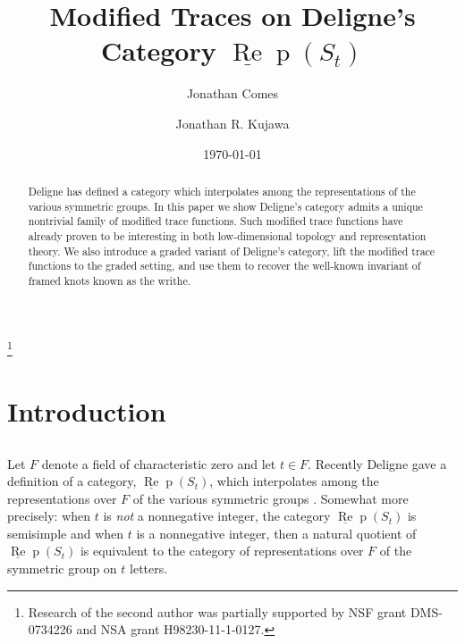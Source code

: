 \documentclass[12pt, reqno]{amsart}
\theoremstyle{definition}
\def\uRep{\underline{\operatorname{Re}}\!\operatorname{p}}
\renewcommand{\1}{_{(1)}}
\renewcommand{\2}{_{(2)}}
\newcommand{\3}{_{(3)}}
\newcommand{\4}{_{(4)}}
\begin{document}
\title{Modified Traces on Deligne's Category $\uRep (S_{t})$}


\author{Jonathan Comes }
\address{Department of Mathematics \\
          University of Oregon\\
          Eugene, OR 97403}
\author{Jonathan R. Kujawa}
\address{Department of Mathematics \\
          University of Oklahoma \\
          Norman, OK 73019}
\thanks{Research of the second author was partially supported by NSF grant
DMS-0734226 and NSA grant H98230-11-1-0127.}\
\date{\today}

\begin{abstract} Deligne has defined a category which interpolates among the representations of the various symmetric groups.  In this paper we show Deligne's category admits a unique nontrivial family of modified trace functions.  Such modified trace functions have already proven to be interesting in both low-dimensional topology and representation theory.  We also introduce a graded variant of Deligne's category, lift the modified trace functions to the graded setting, and use them to recover the well-known invariant of framed knots known as the writhe. 
\end{abstract}

\maketitle






\section{Introduction}\label{S:Intro}  

\subsection{}  Let $F$ denote a field of characteristic zero and let $t \in F$.  Recently Deligne gave a definition of a category, $\uRep (S_{t})$, which interpolates among the representations over $F$ of the various symmetric groups \cite{Del07}.  Somewhat more precisely: when $t$ is \emph{not} a nonnegative integer, the category $\uRep (S_{t})$ is semisimple and when $t$ is a nonnegative integer, then a natural quotient of $\uRep (S_{t})$ is equivalent to the category of representations over $F$ of the symmetric group on $t$ letters.   
\end{document}
